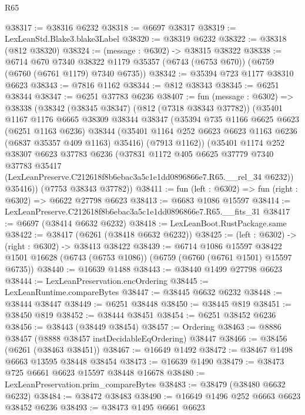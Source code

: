 \begin{lexlean}{R65}
\begin{coremodule}
{@38317 := @38316 @6232
@38318 := @6697 @38317
@38319 := LexLeanStd.Blake3.blake3Label
@38320 := @38319 @6232
@38322 := @38318 (@812 @38320)
@38324 := (message : @6302) -> @38315 @38322
@38338 := @6714
    @670
    @7340
    @38322
    @1179
    @35357
    (@6743 (@6753 @670))
    (@6759 (@6760 (@6761 @1179) @7340 @6735))
@38342 := @35394 @723 @1177 @38310 @6623
@38343 := @7816 @1162
@38344 := @812 @38343
@38345 := @6251 @38344
@38347 := @6251 @37783 @6236
@38407 := fun (message : @6302) =>
  @38338
    (@38342
      (@38345 @38347)
      (@812 (@7318 @38343 @37782))
      (@35401
        @1167
        @1176
        @6665
        @38309
        @38344
        @38347
        (@35394
          @735
          @1166
          @6625
          @6623
          (@6251 @1163 @6236)
          @38344
          (@35401 @1164 @252 @6623 @6623 @1163 @6236 (@6837 @35357 @409 @1163) @35416)
          (@7913 @1162))
        (@35401
          @1174
          @252
          @38307
          @6623
          @37783
          @6236
          (@37831
            @1172
            @405
            @6625
            @37779
            @7340
            @37783
            @35417
            (LexLeanPreserve.C212618f8b6ebac3a5c1e1dd0896866e7.R65.__rel_34 @6232))
          @35416))
      (@7753 @38343 @37782))
@38411 := fun (left : @6302) => fun (right : @6302) => @6622 @27798 @6623
@38413 := @6683 @1086 @15597
@38414 := LexLeanPreserve.C212618f8b6ebac3a5c1e1dd0896866e7.R65.__fits_31
@38417 := @6697 (@38414 @6632 @6232)
@38418 := LexLeanBoot.RustPackage.same
@38422 := @38417 (@6261 (@38418 @6632 @6232))
@38425 := (left : @6302) -> (right : @6302) -> @38413 @38422
@38439 := @6714
    @1086
    @15597
    @38422
    @1501
    @16628
    (@6743 (@6753 @1086))
    (@6759 (@6760 (@6761 @1501) @15597 @6735))
@38440 := @16639 @1488
@38443 := @38440 @1499 @27798 @6623
@38444 := LexLeanPreservation.encOrdering
@38445 := LexLeanRuntime.compareBytes
@38447 := @38445 @6632 @6232
@38448 := @38444 @38447
@38449 := @6251 @38448
@38450 := @38445 @819
@38451 := @38450 @819
@38452 := @38444 @38451
@38454 := @6251 @38452 @6236
@38456 := @38443 (@38449 @38454)
@38457 := Ordering
@38463 := @8886 @38457 (@8888 @38457 instDecidableEqOrdering) @38447
@38466 := @38456 (@6261 (@38463 @38451))
@38467 := @16649 @1492
@38472 := @38467 @1498 @6663 @13595 @38448 @38454
@38473 := @16639 @1490
@38479 := @38473 @725 @6661 @6623 @15597 @38448 @16678
@38480 := LexLeanPreservation.prim_compareBytes
@38483 := @38479 (@38480 @6632 @6232)
@38484 := @38472 @38483
@38490 := @16649 @1496 @252 @6663 @6623 @38452 @6236
@38493 := @38473 @1495 @6661 @6623
}
\end{coremodule}
\end{lexlean}
